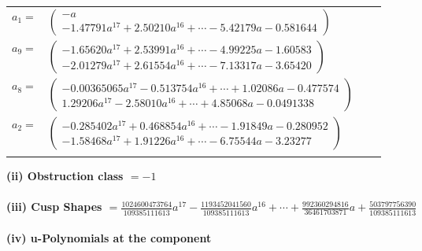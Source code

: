 \documentclass[1p]{elsarticle_modified}
\theoremstyle{definition}
\begin{document}
\begin{tabular}{m{7pt} m{180pt} m{7pt} m{180pt} }
\flushright $a_{1}=$&$\begin{pmatrix}- a\\-1.47791 a^{17}+2.50210 a^{16}+\cdots-5.42179 a-0.581644\end{pmatrix}$ \\
\flushright $a_{9}=$&$\begin{pmatrix}-1.65620 a^{17}+2.53991 a^{16}+\cdots-4.99225 a-1.60583\\-2.01279 a^{17}+2.61554 a^{16}+\cdots-7.13317 a-3.65420\end{pmatrix}$ \\
\flushright $a_{8}=$&$\begin{pmatrix}-0.00365065 a^{17}-0.513754 a^{16}+\cdots+1.02086 a-0.477574\\1.29206 a^{17}-2.58010 a^{16}+\cdots+4.85068 a-0.0491338\end{pmatrix}$ \\
\flushright $a_{2}=$&$\begin{pmatrix}-0.285402 a^{17}+0.468854 a^{16}+\cdots-1.91849 a-0.280952\\-1.58468 a^{17}+1.91226 a^{16}+\cdots-6.75544 a-3.23277\end{pmatrix}$\\&\end{tabular}
\flushleft \textbf{(ii) Obstruction class $= -1$}\\~\\
\flushleft \textbf{(iii) Cusp Shapes $= \frac{1024600473764}{109385111613} a^{17}-\frac{1193452041560}{109385111613} a^{16}+\cdots+\frac{992360294816}{36461703871} a+\frac{503797756390}{109385111613}$}\\~\\
\newpage\renewcommand{\arraystretch}{1}
\flushleft \textbf{(iv) u-Polynomials at the component}\newline \\
\end{document}
